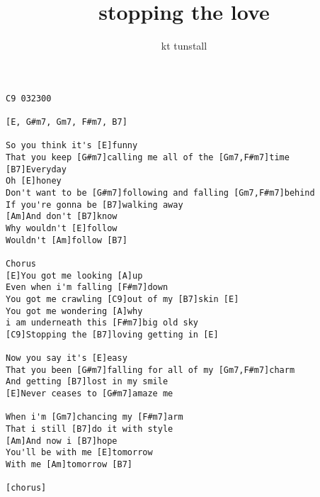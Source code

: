 \author{kt tunstall}
\title{stopping the love}
\maketitle
\begin{verbatim}
C9 032300

[E, G#m7, Gm7, F#m7, B7]

So you think it's [E]funny
That you keep [G#m7]calling me all of the [Gm7,F#m7]time
[B7]Everyday
Oh [E]honey
Don't want to be [G#m7]following and falling [Gm7,F#m7]behind
If you're gonna be [B7]walking away
[Am]And don't [B7]know
Why wouldn't [E]follow
Wouldn't [Am]follow [B7]

Chorus
[E]You got me looking [A]up
Even when i'm falling [F#m7]down
You got me crawling [C9]out of my [B7]skin [E]
You got me wondering [A]why
i am underneath this [F#m7]big old sky
[C9]Stopping the [B7]loving getting in [E]
        
Now you say it's [E]easy
That you been [G#m7]falling for all of my [Gm7,F#m7]charm
And getting [B7]lost in my smile
[E]Never ceases to [G#m7]amaze me
                      
When i'm [Gm7]chancing my [F#m7]arm
That i still [B7]do it with style
[Am]And now i [B7]hope
You'll be with me [E]tomorrow
With me [Am]tomorrow [B7]

[chorus]
\end{verbatim}